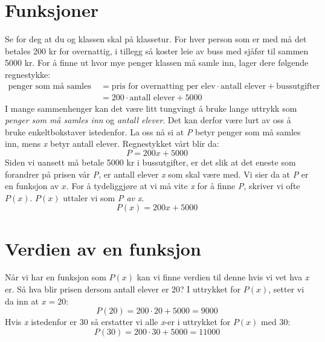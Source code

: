 

\usepackage{pgfplots}


\section{Funksjoner \label{f1}}

Se for deg at du og klassen skal på klassetur. For hver person som er med må det betales 200 kr for overnattig, i tillegg så koster leie av buss med sjåfør til sammen 5000 kr. For å finne ut hvor mye penger klassen må samle inn, lager dere følgende regnestykke:
\begin{align*}
	\text{penger som må samles inn}&=\text{pris for overnatting per elev} \cdot \text{antall elever}+\text{bussutgifter} \\
	&= 200\cdot\text{antall elever} + 5000
\end{align*}
I mange sammenhenger kan det være litt tungvingt å bruke lange uttrykk som \textit{penger som må samles inn} og \textit{antall elever}. Det kan derfor være lurt av oss å bruke enkeltbokstaver istedenfor. La oss nå si at \textit{P} betyr penger som må samles inn, mens \textit{x} betyr antall elever. Regnestykket vårt blir da:
$$P=200x+5000$$
Siden vi uansett må betale 5000 kr i bussutgifter, er det slik at det eneste som forandrer på prisen vår \textit{P}, er antall elever \textit{x} som skal være med. Vi sier da at \textit{P} er en funksjon av $x$. For å tydeliggjøre at vi må vite \textit{x} for å finne \textit{P}, skriver vi ofte $P(x)$. $P(x)$ uttaler vi som \textit{P av x}.
$$P(x)=200x+5000$$

\section{Verdien av en funksjon}
Når vi har en funksjon som $ P(x) $ kan vi finne verdien til denne hvis vi vet hva \textit{x} er.
Så hva blir prisen dersom antall elever er 20? I uttrykket for $P(x)$, setter vi da inn at $x=20$:
$$P(20)=200\cdot20+5000=9000$$
Hvis \textit{x} istedenfor er 30 så erstatter vi alle \textit{x}-er i uttrykket for $ P(x) $ med 30:
$$P(30)=200\cdot30+5000=11000$$


